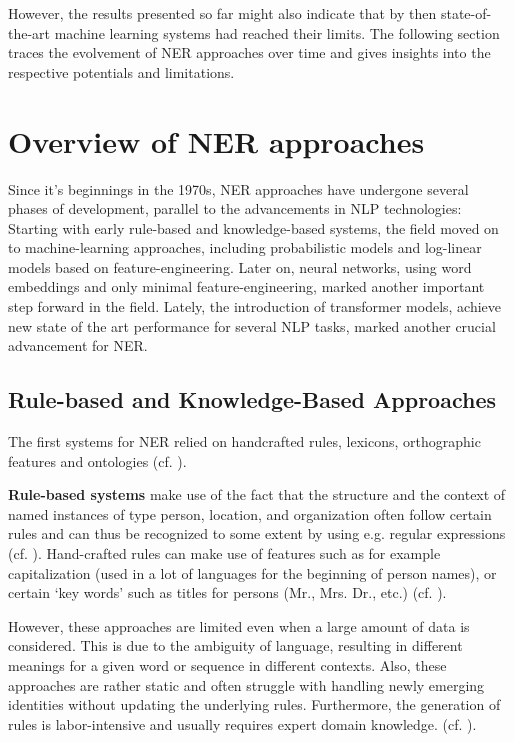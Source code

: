 However, the results presented so far might also indicate that by then state-of-the-art machine learning systems had reached their limits. The following section traces the evolvement of NER approaches over time and gives insights into the respective potentials and limitations. 
 
\section{Overview of NER approaches}

Since it's beginnings in the 1970s, NER approaches have undergone several phases of development, parallel to the advancements in NLP technologies:  Starting with early rule-based and knowledge-based systems, the field moved on to machine-learning approaches, including probabilistic models and log-linear models based on feature-engineering. Later on, neural networks, using word embeddings and only minimal feature-engineering, marked another important step forward in the field. Lately, the introduction of transformer models, achieve new state of the art performance for several NLP tasks, marked another crucial advancement for NER. 

\subsection{Rule-based and Knowledge-Based Approaches}
The first systems for NER relied on handcrafted rules, lexicons, orthographic features and ontologies (cf. \cite{yadav_survey_2019}). 

\textbf{Rule-based systems} make use of the fact that the structure and the context of named instances of type person, location, and organization often follow certain rules and can thus be recognized to some extent by using e.g. regular expressions (cf. \cite[230]{zong_information_2021}). Hand-crafted rules can make use of features such as for example capitalization (used in a lot of languages for the beginning of person names), or certain `key words' such as titles for persons (Mr., Mrs. Dr., etc.) (cf. \cite[230]{zong_information_2021}).

However, these approaches are limited even when a large amount of data is considered. This is due to the ambiguity of language, resulting in different meanings for a given word or sequence in different contexts. Also, these approaches are rather static and often struggle with handling newly emerging identities without updating the underlying rules. Furthermore, the generation of rules is labor-intensive and usually requires expert domain knowledge. (cf. \cite[231]{zong_information_2021}). 


